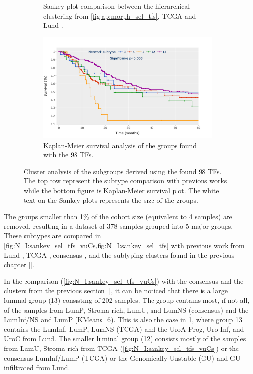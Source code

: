 \begin{figure}[!h]
\begin{subfigure}[!t]{0.49\textwidth}
    \caption{Sankey plot comparison between the hierarchical clustering from \cref{fig:ap:morph_sel_tfs}, TCGA \cite{Robertson2017-mg} and Lund \cite{Marzouka2018-ge}.}
    
    \label{fig:N_I:sankey_sel_tfs}
\end{subfigure}
\centering
\begin{subfigure}[!t]{0.7\textwidth}
    \includegraphics[width=1.0\textwidth,height=1.0\textheight,keepaspectratio]
    {Sections/Network_I/Resources/selective_pruning/survival_sel_tfs_cs.png}
    \caption{Kaplan-Meier survival analysis of the groups found with the 98 TFs. }
    \label{fig:N_I:sel_tfs_survival}
\end{subfigure} 

    \caption{Cluster analysis of the subgroups derived using the found 98 TFs. The top row represent the subtype comparison with previous works while the bottom figure is Kaplan-Meier survival plot. The white text on the Sankey plots represents the size of the groups.}
    \label{fig:N_I:sel_tfs_cs_analysis}
\end{figure}
 
The groups smaller than 1\% of the cohort size (equivalent to 4 samples) are removed, resulting in a dataset of 378 samples grouped into 5 major groups. These subtypes are compared in \cref{fig:N_I:sankey_sel_tfs_vuCs,fig:N_I:sankey_sel_tfs} with previous work from Lund \citet{Marzouka2018-ge}, TCGA \citet{Robertson2017-mg}, consensus \citet{Kamoun2020-tj}, and the subtyping clusters found in the previous chapter \ref{}. 

In the comparison (\cref{fig:N_I:sankey_sel_tfs_vuCs}) with the consensus and the clusters from the previous section \ref{}, it can be noticed that there is a large luminal group (13) consisting of 202 samples. The group contains most, if not all, of the samples from LumP, Stroma-rich, LumU, and LumNS (consensus) and the LumInf/NS and LumP (KMeans\_6). This is also the case in \cref{fig:N_I:sankey_sel_tfs}, where group 13 contains the LumInf, LumP, LumNS (TCGA) and the UroA-Prog, Uro-Inf, and UroC from Lund. The smaller luminal group (12) consists mostly of the samples from LumU, Stroma-rich from TCGA (\cref{fig:N_I:sankey_sel_tfs_vuCs}) or the consensus LumInf/LumP (TCGA) or the Genomically Unstable (GU) and GU-infiltrated from Lund. 

